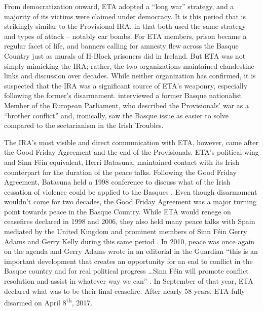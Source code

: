 \documentclass[basque,american]{../../../coursework}
\begin{document}
From democratization onward, ETA adopted a \enquote{long war} strategy, and a
majority of its victims were claimed under democracy. It is this period that
is strikingly similar to the Provisional IRA, in that both used the same
strategy and types of attack -- notably car bombs. For ETA members, prison
became a regular facet of life, and banners calling for amnesty flew across
the Basque Country just as murals of H-Block prisoners did in Ireland. But ETA
was not simply mimicking the IRA; rather, the two organizations maintained
clandestine links and discussion over decades. While neither organization has
confirmed, it is suspected that the IRA was a significant source of ETA's
weaponry, especially following the former's disarmament.
\textcite{Whitfield2014} interviewed a former Basque nationalist Member of the
European Parliament, who described the Provisionals' war as a \enquote{brother
conflict} and, ironically, saw the Basque issue as easier to solve compared to
the sectarianism in the Irish Troubles.

The IRA's most visible and direct communication with ETA, however, came after
the Good Friday Agreement and the end of the Provisionals. ETA's political
wing and Sinn Féin equivalent, \foreignlanguage{basque}{Herri Batasuna},
maintained contact with its Irish counterpart for the duration of the peace
talks. Following the Good Friday Agreement, \foreignlanguage{basque}{Batasuna}
held a 1998 conference to discuss what of the Irish cessation of violence
could be applied to the Basques \parencite[45]{Muroa2017}. Even though
disarmament wouldn't come for two decades, the Good Friday Agreement was a
major turning point towards peace in the Basque Country. While ETA would
renege on ceasefires declared in 1998 and 2006, they also held many peace
talks with Spain mediated by the United Kingdom and prominent members of Sinn
Féin Gerry Adams and Gerry Kelly during this same period
\parencite[162]{Whitfield2014}. In 2010, peace was once again on the agenda
and Gerry Adams wrote in an editorial in the Guardian \enquote{this is an
important development that creates an opportunity for an end to conflict in
the Basque country and for real political progress \dots Sinn Féin will
promote conflict resolution and assist in whatever way we can}
\parencite{Adams2010}. In September of that year, ETA declared what was to be
their final ceasefire. After nearly 58 years, ETA fully disarmed on April
8\textsuperscript{th}, 2017.
\end{document}
